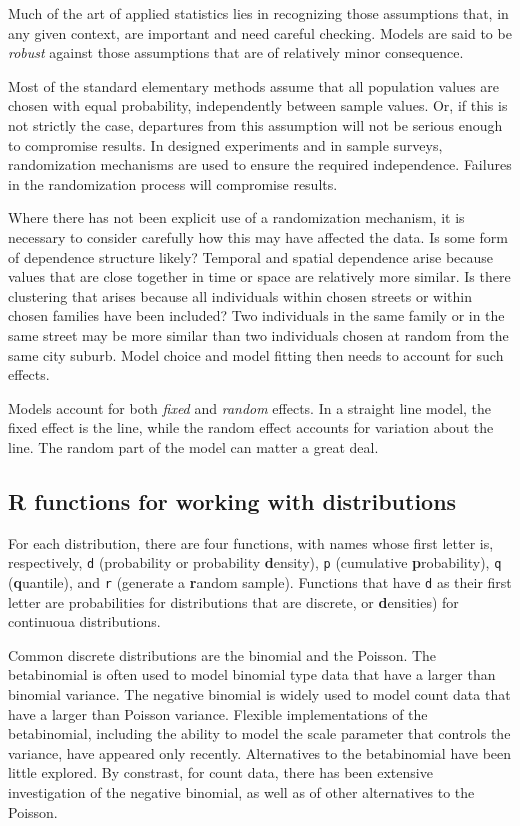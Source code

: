 Much of the art of applied statistics lies in recognizing those
assumptions that, in any given context, are important and need 
careful checking. Models are said to be \textit{robust} against 
those assumptions that are of relatively minor consequence.

Most of the standard elementary methods assume that all population 
values are chosen with equal probability, independently between 
sample values.  Or, if this is not strictly the case, departures
from this assumption will not be serious enough to compromise
results.  In designed experiments and in sample surveys, 
randomization mechanisms are used to ensure the required 
independence.  Failures in the randomization process will 
compromise results.

Where there has not been explicit use of a randomization mechanism,
it is necessary to consider carefully how this may have affected the
data. Is some form of dependence structure likely? Temporal and
spatial dependence arise because values that are close together in
time or space are relatively more similar. Is there clustering that
arises because all individuals within chosen streets or within chosen
families have been included? Two individuals in the same family or in
the same street may be more similar than two individuals chosen at
random from the same city suburb.  Model choice and model fitting
then needs to account for such effects.  

Models account for both
\textit{fixed} and \textit{random} effects.  In a straight line
model, the fixed effect is the line, while the random effect
accounts for variation about the line.  The random part of the
model can matter a great deal.

\subsection{R functions for working with distributions}

For each distribution, there are four functions, with names
whose first letter is, respectively, \texttt{d} (probability or
probability \textbf{d}ensity),
\texttt{p} (cumulative \textbf{p}robability),
\texttt{q} (\textbf{q}uantile), and \texttt{r} (generate a
\textbf{r}andom sample).  Functions that have \texttt{d} as
their first letter are probabilities for distributions that are
discrete, or \textbf{d}ensities) for continuoua distributions.

Common discrete distributions are the binomial and the Poisson.
The betabinomial is often used to model binomial type data that
have a larger than binomial variance.  The negative binomial
is widely used to model count data that have a larger than
Poisson variance.  Flexible implementations of the betabinomial,
including the ability to model the scale parameter that controls
the variance, have appeared only recently.  Alternatives to the
betabinomial have been little explored.  By constrast, for count
data, there has been extensive investigation of the negative
binomial, as well as of other alternatives to the Poisson.

